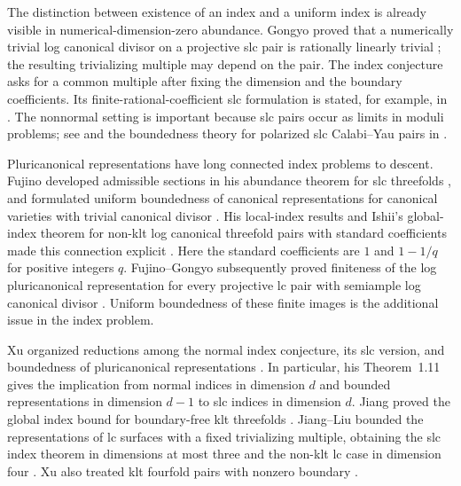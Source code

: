 The distinction between existence of an index and a uniform index is
already visible in numerical-dimension-zero abundance. Gongyo proved that
a numerically trivial log canonical divisor on a projective slc pair is
rationally linearly trivial \citep[Theorem~1.5]{Gongyo2013}; the resulting
trivializing multiple may depend on the pair. The index conjecture asks
for a common multiple after fixing the dimension and the boundary
coefficients. Its finite-rational-coefficient slc formulation is stated,
for example, in \citet[Conjecture~1.5]{JiangLiu}. The nonnormal setting is
important because slc pairs occur as limits in moduli problems; see
\citet{Kollar2013} and the boundedness theory for polarized slc
Calabi--Yau pairs in \citet{Birkar2023}.

Pluricanonical representations have long connected index problems to
descent. Fujino developed admissible sections in his abundance theorem
for slc threefolds \citep{Fujino2000}, and formulated uniform boundedness
of canonical representations for canonical varieties with trivial canonical
divisor \citep[Conjecture~3.2]{Fujino2001}. His local-index results and
Ishii's global-index theorem for non-klt log canonical threefold pairs
with standard coefficients made this connection explicit
\citep{Fujino2001,Ishii2000}. Here the standard coefficients are
$1$ and $1-1/q$ for positive integers $q$.
Fujino--Gongyo subsequently proved finiteness of the log pluricanonical
representation for every projective lc pair with semiample log canonical
divisor \citep[Theorem~1.1]{FujinoGongyo2014}. Uniform boundedness of these
finite images is the additional issue in the index problem.

Xu organized reductions among the normal index conjecture, its slc
version, and boundedness of pluricanonical representations
\citep{Xu2019}. In particular, his Theorem~1.11 gives the implication
from normal indices in dimension $d$ and bounded representations in
dimension $d-1$ to slc indices in dimension $d$.
Jiang proved the global index bound for boundary-free klt threefolds
\citep[Corollary~1.7]{Jiang2021}.
Jiang--Liu bounded the representations of lc surfaces with a fixed
trivializing multiple, obtaining the slc index theorem in dimensions at
most three and the non-klt lc case in dimension four
\citep[Theorem~1.4 and Corollaries~1.6--1.7]{JiangLiu}.
Xu also treated klt fourfold pairs with nonzero boundary
\citep[Theorem~1.14]{Xu2019}.


